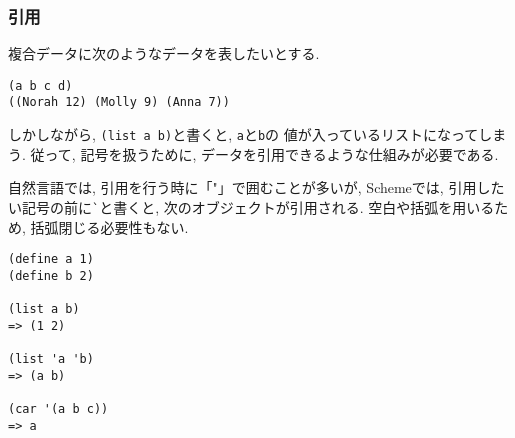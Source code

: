 \subsubsection{引用}
%
複合データに次のようなデータを表したいとする.
%
\begin{lstlisting}[basicstyle=\footnotesize,title=任意の記号の入ったデータ]
(a b c d)
((Norah 12) (Molly 9) (Anna 7))
\end{lstlisting}
%
しかしながら, \lstinline{(list a b)}と書くと,
\lstinline{a}と\lstinline{b}の
値が入っているリストになってしまう. 従って, 記号を扱うために,
データを引用できるような仕組みが必要である.

自然言語では, 引用を行う時に「"」で囲むことが多いが,
Schemeでは, 引用したい記号の前に\lstinline{`}と書くと,
次のオブジェクトが引用される. 空白や括弧を用いるため,
括弧閉じる必要性もない.

\begin{lstlisting}[basicstyle=\footnotesize,title=記号データの例]
(define a 1)
(define b 2)

(list a b)
=> (1 2)

(list 'a 'b)
=> (a b)

(car '(a b c))
=> a
\end{lstlisting}
